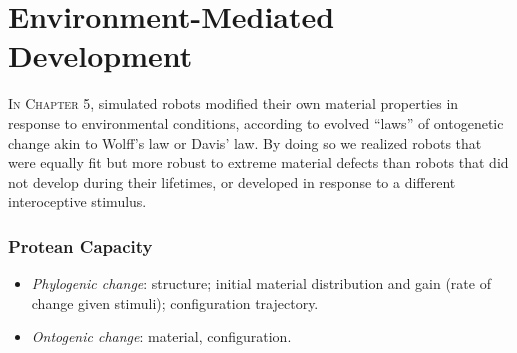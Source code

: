 


\section{Environment-Mediated Development}

\textsc{In Chapter 5,}
simulated robots modified their own material properties
in response to environmental conditions,
according to evolved ``laws'' of ontogenetic change akin to Wolff's law or Davis' law.
By doing so we realized robots that were equally fit but more robust to extreme material defects than robots that did not develop during their lifetimes, or developed in response to a different interoceptive stimulus.


\subsubsection*{Protean Capacity}

\begin{itemize}
    \item \textit{Phylogenic change}: structure; initial material distribution and gain (rate of change given stimuli); configuration trajectory.
    \item \textit{Ontogenic change}: material, configuration.
\end{itemize}


